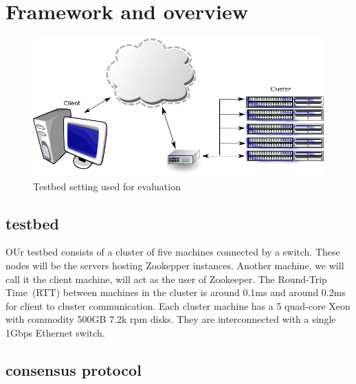 \section{Framework and overview}\label{sec:framework}

\begin{figure}[h]
\centering
\includegraphics[scale=0.85]{img/framework.eps}
\caption{Testbed setting used for evaluation}
\label{fig:framework}
\end{figure}

\subsection{testbed}
OUr testbed consists of a cluster of five machines connected by a switch. These nodes will be the servers hosting Zookepper instances. Another machine, we will call it the client machine, will act as the user of Zookeeper. The Round-Trip Time~(RTT) between machines in the cluster is around 0.1ms and around 0.2ms for client to cluster communication. Each cluster machine has a 5 quad-core Xeon  with commodity 500GB 7.2k rpm disks. They are interconnected with a single 1Gbps Ethernet switch.

\subsection{consensus protocol}

